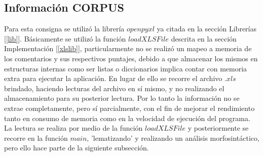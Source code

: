 \documentclass[12pt]{article}
\begin{document}
\subsection{Información CORPUS}
Para esta consigna se utilizó la librería $openpyxl$ ya citada en la sección Librerías [\ref{lib}]. Básicamente se utilizó la función $loadXLSFile$ descrita en la sección Implementación [\ref{xlslib}], particularmente no se realizó un mapeo a memoria de los comentarios y sus respectivos puntajes, debido a que almacenar los mismos en estructuras internas como ser listas o diccionarios implica contar con memoria extra para ejecutar la aplicación. En lugar de ello se recorre el archivo $.xls$ brindado, haciendo lecturas del archivo en sí mismo, y no realizando el almacenamiento para su posterior lectura. Por lo tanto la información no se extrae completamente, pero sí parcialmente, con el fin de mejorar el rendimiento tanto en consumo de memoria como en la velocidad de ejecución del programa.
La lectura se realiza por medio de la función $loadXLSFile$ y posteriormente se recorre en la función $main$, 'lematizando' y realizando un análisis morfosintáctico, pero ello hace parte de la siguiente subsección.
\end{document}
